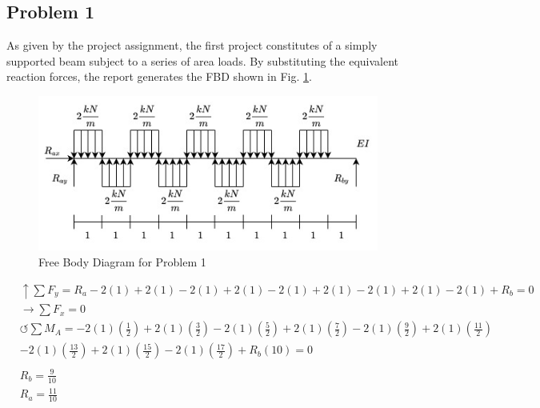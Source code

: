 \documentclass[a4paper]{article}
\begin{document}
\subsection{Problem 1}

As given by the project assignment, the first project constitutes of a simply supported beam subject to a series of area loads. By substituting the equivalent reaction forces, the report generates the FBD shown in Fig. \ref{FBD_1}.

\begin{figure}[h]
\includegraphics[width=\textwidth]{FBD/FBD_1.jpg}
\caption{Free Body Diagram for Problem 1}
\label{FBD_1}
\end{figure}

\begin{equation}
\begin{split}
	&\uparrow \sum F_y = R_a - 2(1) + 2(1) - 2(1) + 2(1) - 2(1) + 2(1) - 2(1) + 2(1) - 2(1) + R_b = 0 \\
 	&\rightarrow \sum F_x = 0 \\
 	&\circlearrowleft \sum M_A = -2(1)\left(\frac{1}{2}\right) + 2(1)\left(\frac{3}{2}\right) - 2(1)\left(\frac{5}{2}\right) + 2(1)\left(\frac{7}{2}\right) - 2(1)\left(\frac{9}{2}\right) + 2(1)\left(\frac{11}{2}\right) \\ 
	& - 2(1)\left(\frac{13}{2}\right) + 2(1)\left(\frac{15}{2}\right) - 2(1)\left(\frac{17}{2}\right) + R_b(10) = 0 \\
	& \\
	& R_b = \frac{9}{10} \\
	& R_a = \frac{11}{10} \\
\end{split}
\label{problem1_reaction_equation}
\end{equation}
\end{document}
